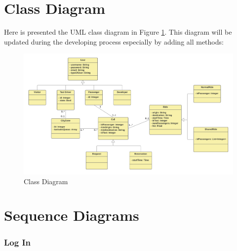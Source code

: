\section{Class Diagram}
Here is presented the UML class diagram in Figure \ref{fig:classdiag}. This diagram will be updated during the developing process especially by adding all methods:

\begin{figure}[h]
\centering
\includegraphics[width=\paperwidth, angle=90]{cpt/img/ClassDiagram}
\caption{Class Diagram}
\label{fig:classdiag}
\end{figure}
\clearpage

\section{Sequence Diagrams}

\subsubsection{Log In}

